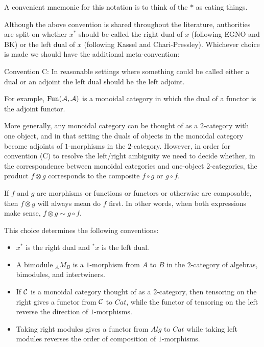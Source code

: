 \documentclass{amsart}
\begin{document}
\nid A convenient mnemonic for this notation is to think of the $*$ as eating things.  

Although the above convention is shared throughout the literature, authorities are split on whether $x^*$ should be called the right dual of $x$ (following EGNO and BK)  or the left dual of $x$ (following Kassel and Chari-Pressley).  Whichever choice is made we should have the additional meta-convention: \vspace{1.5ex}

\nid Convention C:
In reasonable settings where something could be called either a dual or an adjoint the left dual should be the left adjoint. \vspace{1.5ex}

\nid For example, $\operatorname{Fun}(\mathcal A, \mathcal A)$ is a monoidal category in which the dual of a functor is the adjoint functor.  

More generally, any monoidal category can be thought of as a $2$-category with one object, and in that setting the duals of objects in the monoidal category become adjoints of $1$-morphisms in the $2$-category.  However, in order for convention (C) to resolve the left/right ambiguity we need to decide whether, in the correspondence between monoidal categories and one-object 2-categories, the product $f \otimes g$ corresponds to the composite $f \circ g$ or $g \circ f$.

\begin{definition}
If $f$ and $g$ are morphisms or functions or functors or otherwise are composable, then $f \otimes g$ will always mean do $f$ first. In other words, when both expressions make sense, $f \otimes g \sim g \circ f$.
\end{definition}

This choice determines the following conventions:

\begin{itemize}
\item $x^*$ is the right dual and ${}^*x$ is the left dual.
\item A bimodule ${}_A M_B$ is a $1$-morphism from $A$ to $B$ in the $2$-category of algebras, bimodules, and intertwiners. 
\item If $\mathcal C$ is a monoidal category thought of as a $2$-category, then tensoring on the right gives a functor from $\mathcal C$ to $Cat$, while the functor of tensoring on the left reverse the direction of $1$-morphisms. 
\item Taking right modules gives a functor from $Alg$ to $Cat$ while taking left modules reverses the order of composition of $1$-morphisms.
\end{itemize}
\end{document}
